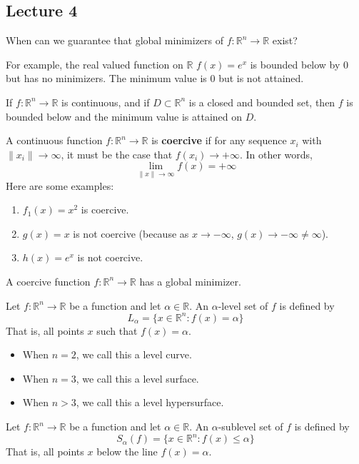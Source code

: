 \subsection{Lecture 4}


\begin{problem}[Motivation]
  When can we guarantee that global minimizers of $f: \mathbb R^n \rightarrow \mathbb R$ exist?

  For example, the real valued function on $\mathbb R$ $f(x) = e^x$ is bounded below by 0 but has no minimizers. The minimum value is 0 but is not attained.
\end{problem}
\begin{proposition}
  If $f: \mathbb R^n \rightarrow \mathbb R$ is continuous, and if $D \subset \mathbb R^n$ is a closed and bounded set, then $f$ is bounded below and the minimum value is attained on $D$.
\end{proposition}
\begin{definition}
  A continuous function $f: \mathbb R^n \rightarrow \mathbb R$ is \textbf{coercive} if for any sequence $x_i$ with $\|x_i \| \rightarrow \infty$, it must be the case that $f(x_i) \rightarrow +\infty$. In other words, $$\lim_{\|x\| \rightarrow \infty} f(x) = +\infty$$
  Here are some examples:
  \begin{enumerate}
    \item $f_1(x) = x^2$ is coercive.
    \item $g(x) = x$ is not coercive (because as $x \rightarrow -\infty$, $g(x) \rightarrow -\infty \neq \infty$).
    \item $h(x) = e^x$ is not coercive.
  \end{enumerate}
\end{definition}
\begin{proposition}
  A coercive function $f: \mathbb R^n \rightarrow \mathbb R$ has a global minimizer.
\end{proposition}
\begin{definition}
  Let $f: \mathbb R^n \to \mathbb R$ be a function and let $\alpha \in \mathbb R$. An $\alpha$-level set of $f$ is defined by $$L_\alpha = \{x \in \mathbb R^n: f(x) = \alpha\}$$
  That is, all points $x$ such that $f(x) = \alpha$.
  \begin{itemize}
    \item When $n = 2$, we call this a level curve.
    \item When $n = 3$, we call this a level surface.
    \item When $n > 3$, we call this a level hypersurface.
  \end{itemize}
\end{definition}
\begin{definition}
  Let $f: \mathbb R^n \to \mathbb R$ be a function and let $\alpha \in \mathbb R$. An $\alpha$-sublevel set of $f$ is defined by $$S_\alpha(f) = \{x \in \mathbb R^n: f(x) \leq \alpha\}$$
  That is, all points $x$ below the line $f(x) = \alpha$.
\end{definition}


